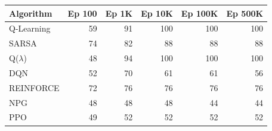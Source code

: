\begin{tabular}{lrrrrr}
\hline
Algorithm & Ep 100 & Ep 1K & Ep 10K & Ep 100K & Ep 500K \\
\hline
Q-Learning & 59 & 91 & 100 & 100 & 100 \\
SARSA & 74 & 82 & 88 & 88 & 88 \\
Q($\lambda$) & 48 & 94 & 100 & 100 & 100 \\
DQN & 52 & 70 & 61 & 61 & 56 \\
REINFORCE & 72 & 76 & 76 & 76 & 76 \\
NPG & 48 & 48 & 48 & 44 & 44 \\
PPO & 49 & 52 & 52 & 52 & 52 \\
\hline
\end{tabular}